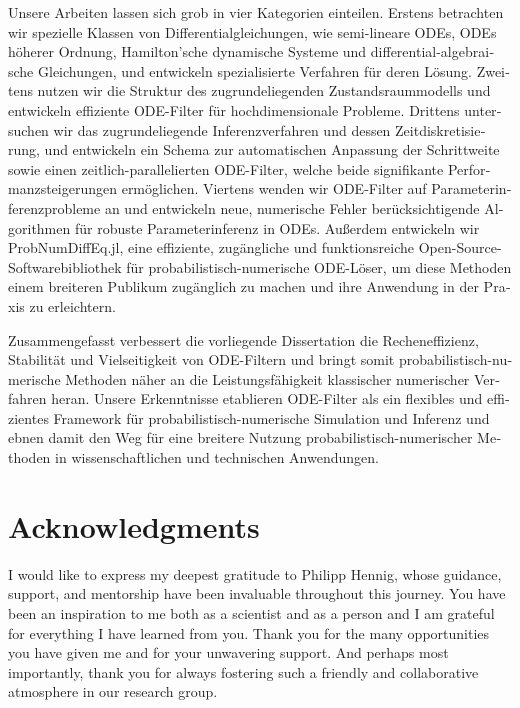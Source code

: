 \documentclass{mimosis}
\begin{document}
\begin{otherlanguage}{italian}
Unsere Arbeiten lassen sich grob in vier Kategorien einteilen.
Erstens betrachten wir spezielle Klassen von Differentialgleichungen, wie semi-lineare ODEs, ODEs höherer Ordnung, Hamilton'sche dynamische Systeme und differential-algebraische Gleichungen, und entwickeln spezialisierte Verfahren für deren Lösung.
Zweitens nutzen wir die Struktur des zugrundeliegenden Zustandsraummodells und entwickeln effiziente ODE-Filter für hochdimensionale Probleme.
Drittens untersuchen wir das zugrundeliegende Inferenzverfahren und dessen Zeitdiskretisierung, und entwickeln ein Schema zur automatischen Anpassung der Schrittweite sowie einen zeitlich-parallelierten ODE-Filter, welche beide signifikante Performanzsteigerungen ermöglichen.
Viertens wenden wir ODE-Filter auf Parameterinferenzprobleme an und entwickeln neue, numerische Fehler berücksichtigende Algorithmen für robuste Parameterinferenz in ODEs.
Au{\ss}erdem
entwickeln wir ProbNumDiffEq.jl, eine effiziente, zugängliche und funktionsreiche Open-Source-Softwarebibliothek für probabilistisch-numerische ODE-Löser, um diese Methoden einem breiteren Publikum zugänglich zu machen und ihre Anwendung in der Praxis zu erleichtern.

Zusammengefasst verbessert die vorliegende Dissertation die Recheneffizienz, Stabilität und Vielseitigkeit von ODE-Filtern und bringt somit probabilistisch-numerische Methoden näher an die Leistungsfähigkeit klassischer numerischer Verfahren heran.
Unsere Erkenntnisse etablieren ODE-Filter als ein flexibles und effizientes Framework für probabilistisch-numerische Simulation und Inferenz und ebnen damit den Weg für eine breitere Nutzung probabilistisch-numerischer Methoden in wissenschaftlichen und technischen Anwendungen.

\end{otherlanguage}

\clearpage
\chapter{Acknowledgments}
\label{sec:org8d94c6e}

I would like to express my deepest gratitude to Philipp Hennig, whose guidance, support, and mentorship have been invaluable throughout this journey.
You have been an inspiration to me both as a scientist and as a person and I am grateful for everything I have learned from you.
Thank you for the many opportunities you have given me and for your unwavering support.
And perhaps most importantly, thank you for always fostering such a friendly and collaborative atmosphere in our research group.
\end{document}
